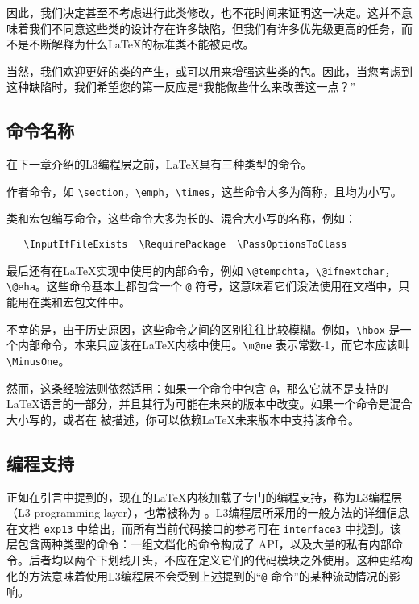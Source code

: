 \documentclass[12pt]{ltxguide}
\begin{document}
因此，我们决定甚至不考虑进行此类修改，也不花时间来证明这一决定。这并不意味着我们不同意这些类的设计存在许多缺陷，但我们有许多优先级更高的任务，而不是不断解释为什么\LaTeX{}的标准类不能被更改。

当然，我们欢迎更好的类的产生，或可以用来增强这些类的包。因此，当您考虑到这种缺陷时，我们希望您的第一反应是“我能做些什么来改善这一点？”

\subsection{命令名称}
在下一章介绍的L3编程层之前，\LaTeX{}具有三种类型的命令。

作者命令，如 \verb|\section|，\verb|\emph|，\verb|\times|，这些命令大多为简称，且均为小写。

类和宏包编写命令，这些命令大多为长的、混合大小写的名称，例如：
\begin{verbatim}
   \InputIfFileExists  \RequirePackage  \PassOptionsToClass
\end{verbatim}

最后还有在\LaTeX{}实现中使用的内部命令，例如 \verb|\@tempchta|，\verb|\@ifnextchar|，\verb|\@eha|。这些命令基本上都包含一个 \verb|@| 符号，这意味着它们没法使用在文档中，只能用在类和宏包文件中。

不幸的是，由于历史原因，这些命令之间的区别往往比较模糊。例如，\verb|\hbox| 是一个内部命令，本来只应该在\LaTeX{}内核中使用。\verb|\m@ne| 表示常数-1，而它本应该叫 \verb|\MinusOne|。

然而，这条经验法则依然适用：如果一个命令中包含 \verb|@|，那么它就不是支持的\LaTeX{}语言的一部分，并且其行为可能在未来的版本中改变。如果一个命令是混合大小写的，或者在 \emph{\LaTeXbook} 被描述，你可以依赖\LaTeX{}未来版本中支持该命令。

\subsection{编程支持}
正如在引言中提到的，现在的\LaTeX{}内核加载了专门的编程支持，称为L3编程层（L3 programming layer），也常被称为 。L3编程层所采用的一般方法的详细信息在文档 \texttt{exp13} 中给出，而所有当前代码接口的参考可在 \texttt{interface3} 中找到。该层包含两种类型的命令：一组文档化的命令构成了 API，以及大量的私有内部命令。后者均以两个下划线开头，不应在定义它们的代码模块之外使用。这种更结构化的方法意味着使用L3编程层不会受到上述提到的“\texttt{@} 命令”的某种流动情况的影响。
\end{document}
